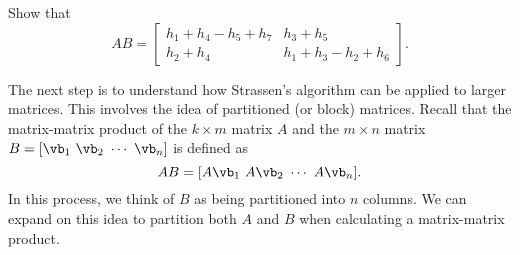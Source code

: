 \begin{pactivity}
Show that 
\[AB = \left[ \begin{array}{cc} h_1+h_4-h_5+h_7 & h_3+h_5 \\ h_2+h_4 & h_1+h_3-h_2+h_6 \end{array} \right].\]	


\ea

\end{pactivity}

The next step is to understand how Strassen's algorithm can be applied to larger matrices. This involves the idea of partitioned (or block) matrices. Recall that the matrix-matrix product of the $k \times m$ matrix $A$ and the $m \times n$ matrix $B = [\vb_1 \ \vb_2 \ \cdots \ \vb_n]$ is defined as 
\[AB = [A\vb_1 \ A\vb_2 \ \cdots \ A\vb_n].\]
In this process, we think of $B$ as being partitioned into $n$ columns. We can expand on this idea to partition both $A$ and $B$ when calculating a matrix-matrix product. 

